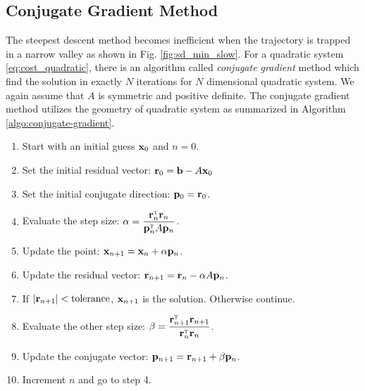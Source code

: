\noindent
\subsection{Conjugate Gradient Method}

The steepest descent method becomes inefficient when the trajectory is trapped in a narrow valley as shown in Fig. \ref{fig:sd_min_slow}.
For a quadratic system \eqref{eq:cost_quadratic}, there is an algorithm called \textit{conjugate gradient} method\cite{cg_min} which find the solution in exactly $N$ iterations for $N$ dimensional quadratic system.  We again assume that $A$ is symmetric and positive definite.  The conjugate gradient method utilizes the geometry of quadratic system as summarized in Algorithm \ref{algo:conjugate-gradient}.

\begin{myalgobox}
   \label{algo:conjugate-gradient}

   \medskip
   \begin{enumerate}
      \item Start with an initial guess $\vb{x}_0$ and $n=0$.
      \item Set the initial residual vector: $\vb{r}_0=\vb{b} - A \vb{x}_0$ 
      \item Set the initial conjugate direction: $\vb{p}_0 = \vb{r}_0$.
      \item Evaluate the step size: $\alpha = \displaystyle\frac{\vb{r}_n^\textsc{t} \vb{r}_n}{\vb{p}_n^\textsc{t} A \vb{p}_n}$.
      \item Update the point:  $\vb{x}_{n+1} = \vb{x}_n + \alpha \vb{p}_n$.
      \item Update the residual vector:  $\vb{r}_{n+1} = \vb{r}_n - \alpha A \vb{p}_n$.
      \item If $|\vb{r}_{n+1}| < \text{tolerance}$, $\vb{x}_{n+1}$ is the solution.  Otherwise continue.
      \item Evaluate the other step size: $\beta = \displaystyle\frac{\vb{r}_{n+1}^\textsc{t} \vb{r}_{n+1}}{\vb{r}_n^\textsc{t} \vb{r}_n}$.
      \item Update the conjugate vector: $\vb{p}_{n+1} = \vb{r}_{n+1} + \beta \vb{p}_n$.
      \item Increment $n$ and go to step 4.
\end{enumerate}

\end{myalgobox}



